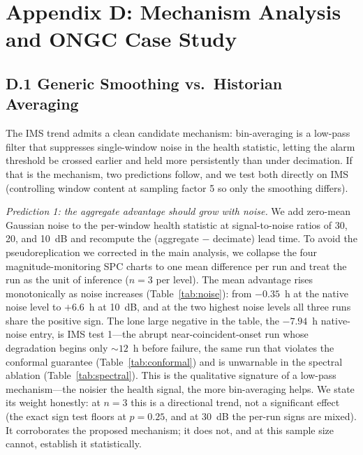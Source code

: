 \documentclass[IJPHM, 2026, 0]{PHMSociety}
\begin{document}
\FloatBarrier
\section*{Appendix D: Mechanism Analysis and ONGC Case Study}

\subsection*{D.1 Generic Smoothing vs.\ Historian Averaging}
The IMS trend admits a clean candidate mechanism: bin-averaging is a low-pass filter that suppresses single-window noise in the health statistic, letting the alarm threshold be crossed earlier and held more persistently than under decimation. If that is the mechanism, two predictions follow, and we test both directly on IMS (controlling window content at sampling factor 5 so only the smoothing differs).

\emph{Prediction 1: the aggregate advantage should grow with noise.} We add zero-mean Gaussian noise to the per-window health statistic at signal-to-noise ratios of 30, 20, and 10~dB and recompute the (aggregate $-$ decimate) lead time. To avoid the pseudoreplication we corrected in the main analysis, we collapse the four magnitude-monitoring SPC charts to one mean difference per run and treat the run as the unit of inference ($n=3$ per level). The mean advantage rises monotonically as noise increases (Table~\ref{tab:noise}): from $-0.35$~h at the native noise level to $+6.6$~h at 10~dB, and at the two highest noise levels all three runs share the positive sign. The lone large negative in the table, the $-7.94$~h native-noise entry, is IMS test 1---the abrupt near-coincident-onset run whose degradation begins only ${\sim}12$~h before failure, the same run that violates the conformal guarantee (Table~\ref{tab:conformal}) and is unwarnable in the spectral ablation (Table~\ref{tab:spectral}). This is the qualitative signature of a low-pass mechanism---the noisier the health signal, the more bin-averaging helps. We state its weight honestly: at $n=3$ this is a directional trend, not a significant effect (the exact sign test floors at $p=0.25$, and at 30~dB the per-run signs are mixed). It corroborates the proposed mechanism; it does not, and at this sample size cannot, establish it statistically.
\end{document}
